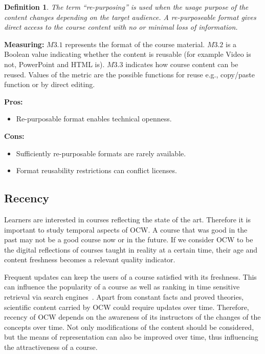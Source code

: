 \documentclass{sig-alternate}
\theoremstyle{definition}
\newtheorem{defn}{Definition}
\begin{document}
\begin{defn}
\emph {The term ``re-purposing'' is used when the usage purpose of the content changes depending on the target audience.
A re-purposeable format gives direct access to the course content with no or minimal loss of information.}
\end{defn}

\noindent\textbf{Measuring:}
$M3.1$ represents the format of the course material.
$M3.2$ is a Boolean value indicating whether the content is reusable (for example Video is not, PowerPoint and HTML is).
$M3.3$ indicates how course content can be reused.
Values of the metric are the possible functions for reuse e.g., copy/paste function or by direct editing.

\noindent\textbf{Pros:}
\begin{itemize}
\item Re-purposable format enables technical openness.
\end{itemize}
\noindent\textbf{Cons:}
\begin{itemize}
\item Sufficiently re-purposable formats are rarely available.
\item Format reusability restrictions can conflict licenses.
\end{itemize}

\subsection{Recency}
\label{sec:Recency}
Learners are interested in courses reflecting the state of the art.
Therefore it is important to study temporal aspects of OCW.
A course that was good in the past may not be a good course now or in the future.
If we consider OCW to be the digital reflections of courses taught in reality at a certain time, their age and content freshness becomes a relevant quality indicator.


Frequent updates can keep the users of a course satisfied with its freshness.
This can influence the popularity of a course as well as ranking in time sensitive retrieval via search engines~\parencite{Dong.2010}.
Apart from constant facts and proved theories, scientific content carried by OCW could require updates over time.
Therefore, recency of OCW depends on the awareness of its instructors of the changes of the concepts over time.
Not only modifications of the content should be considered, but the means of representation can also be improved over time, thus influencing the attractiveness of a course.
\end{document}
